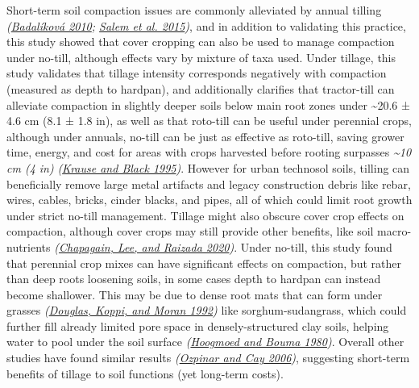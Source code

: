 \documentclass[
  12pt,
]{article}
\begin{document}
Short-term soil compaction issues are commonly alleviated by annual tilling \emph{(\protect\hyperlink{ref-badalikova10}{Badalíková 2010}; \protect\hyperlink{ref-salem15}{Salem et al. 2015})}, and in addition to validating this practice, this study showed that cover cropping can also be used to manage compaction under no-till, although effects vary by mixture of taxa used.
Under tillage, this study validates that tillage intensity corresponds negatively with compaction (measured as depth to hardpan), and additionally clarifies that tractor-till can alleviate compaction in slightly deeper soils below main root zones under
\textasciitilde20.6 ±
4.6 cm
(8.1 ±
1.8 in),
as well as that roto-till can be useful under perennial crops, although under annuals, no-till can be just as effective as roto-till, saving grower time, energy, and cost for areas with crops harvested before rooting surpasses \emph{\textasciitilde10 cm (4 in)} \emph{(\protect\hyperlink{ref-krause95}{Krause and Black 1995})}.
However for urban technosol soils, tilling can beneficially remove large metal artifacts and legacy construction debris like rebar, wires, cables, bricks, cinder blacks, and pipes, all of which could limit root growth under strict no-till management.
Tillage might also obscure cover crop effects on compaction, although cover crops may still provide other benefits, like soil macro-nutrients \emph{(\protect\hyperlink{ref-chapagain20}{Chapagain, Lee, and Raizada 2020})}.
Under no-till, this study found that perennial crop mixes can have significant effects on compaction, but rather than deep roots loosening soils, in some cases depth to hardpan can instead become shallower.
This may be due to dense root mats that can form under grasses \emph{(\protect\hyperlink{ref-douglas92}{Douglas, Koppi, and Moran 1992})} like sorghum-sudangrass, which could further fill already limited pore space in densely-structured clay soils, helping water to pool under the soil surface \emph{(\protect\hyperlink{ref-hoogmoed80}{Hoogmoed and Bouma 1980})}.
Overall other studies have found similar results \emph{(\protect\hyperlink{ref-ozpinar06}{Ozpinar and Cay 2006})}, suggesting short-term benefits of tillage to soil functions (yet long-term costs).
\end{document}
